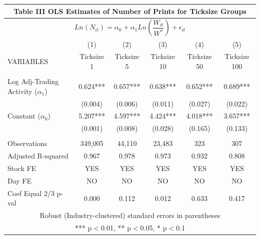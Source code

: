 \documentclass[12pt,a4paper]{article}
\begin{document}
\begin{landscape}
\begin{table}
\begin{center}
\begin{tabular}{lccccc}
\multicolumn{6}{c}{Table III OLS Estimates of Number of Prints for Ticksize Groups} \\ \hline
\multicolumn{6}{c}{$Ln(N_{it}) = \alpha_{0} + \alpha_{1}Ln(\dfrac{W_{it}}{W^{*}}) + \epsilon_{it}$} \\
 & (1) & (2) & (3) & (4) & (5) \\
VARIABLES & Ticksize 1 & Ticksize 5 & Ticksize 10 & Ticksize 50 & Ticksize 100 \\ \hline
 &  &  &  &  &  \\
Log Adj-Trading Activity ($\alpha_{1}$) & 0.624*** & 0.657*** & 0.638*** & 0.652*** & 0.689*** \\
 & (0.004) & (0.006) & (0.011) & (0.027) & (0.022) \\
Constant ($\alpha_{0}$) & 5.207*** & 4.597*** & 4.424*** & 4.018*** & 3.657*** \\
 & (0.001) & (0.008) & (0.028) & (0.165) & (0.133) \\
 &  &  &  &  &  \\
Observations & 349,005 & 44,110 & 23,483 & 323 & 307 \\
Adjusted R-squared & 0.967 & 0.978 & 0.973 & 0.932 & 0.808 \\
Stock FE & YES & YES & YES & YES & YES \\
Day FE & NO & NO & NO & NO & NO \\
 Coef Equal 2/3 p-val & 0.000 & 0.112 & 0.012 & 0.633 & 0.417 \\ \hline
\multicolumn{6}{c}{ Robust (Industry-clustered) standard errors in parentheses} \\
\multicolumn{6}{c}{ *** p$<$0.01, ** p$<$0.05, * p$<$0.1} \\
\end{tabular}
\end{center}
\end{table}
\end{landscape}







\newpage
\end{document}
